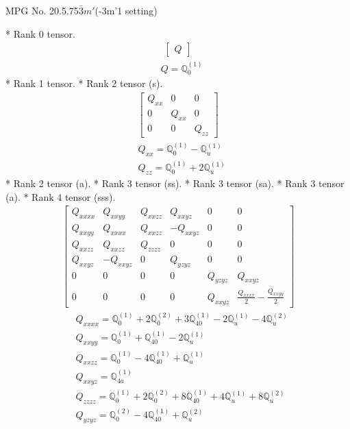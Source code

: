 \documentclass[fleqn,8pt,landscape]{jsarticle}
\begin{document}
\setcounter{MaxMatrixCols}{32}

\renewcommand{\tablename}{Table~}
\renewcommand{\figurename}{Figure~}
\begin{center}
\LARGE
MPG No. 20.5.75\quad$\bar{3}m'$\quad(-3m'1 setting)
\end{center}
* Rank 0 tensor.
\begin{align*}
\begin{bmatrix} Q \end{bmatrix}
\end{align*}
\begin{align*}
& Q = \mathbb{Q}_{0}^{(1)}
\end{align*}
* Rank 1 tensor.
* Rank 2 tensor (s).
\begin{align*}
\begin{bmatrix} Q_{xx} & 0 & 0 \\ 0 & Q_{xx} & 0 \\ 0 & 0 & Q_{zz} \end{bmatrix}
\end{align*}
\begin{align*}
& Q_{xx} = \mathbb{Q}_{0}^{(1)} - \mathbb{Q}_{u}^{(1)} \\
& Q_{zz} = \mathbb{Q}_{0}^{(1)} + 2 \mathbb{Q}_{u}^{(1)}
\end{align*}
* Rank 2 tensor (a).
* Rank 3 tensor (ss).
* Rank 3 tensor (sa).
* Rank 3 tensor (a).
* Rank 4 tensor (sss).
\begin{align*}
\begin{bmatrix} Q_{xxxx} & Q_{xxyy} & Q_{xxzz} & Q_{xxyz} & 0 & 0 \\ Q_{xxyy} & Q_{xxxx} & Q_{xxzz} & - Q_{xxyz} & 0 & 0 \\ Q_{xxzz} & Q_{xxzz} & Q_{zzzz} & 0 & 0 & 0 \\ Q_{xxyz} & - Q_{xxyz} & 0 & Q_{yzyz} & 0 & 0 \\ 0 & 0 & 0 & 0 & Q_{yzyz} & Q_{xxyz} \\ 0 & 0 & 0 & 0 & Q_{xxyz} & \frac{Q_{xxxx}}{2} - \frac{Q_{xxyy}}{2} \end{bmatrix}
\end{align*}
\begin{align*}
& Q_{xxxx} = \mathbb{Q}_{0}^{(1)} + 2 \mathbb{Q}_{0}^{(2)} + 3 \mathbb{Q}_{40}^{(1)} - 2 \mathbb{Q}_{u}^{(1)} - 4 \mathbb{Q}_{u}^{(2)} \\
& Q_{xxyy} = \mathbb{Q}_{0}^{(1)} + \mathbb{Q}_{40}^{(1)} - 2 \mathbb{Q}_{u}^{(1)} \\
& Q_{xxzz} = \mathbb{Q}_{0}^{(1)} - 4 \mathbb{Q}_{40}^{(1)} + \mathbb{Q}_{u}^{(1)} \\
& Q_{xxyz} = \mathbb{Q}_{4a}^{(1)} \\
& Q_{zzzz} = \mathbb{Q}_{0}^{(1)} + 2 \mathbb{Q}_{0}^{(2)} + 8 \mathbb{Q}_{40}^{(1)} + 4 \mathbb{Q}_{u}^{(1)} + 8 \mathbb{Q}_{u}^{(2)} \\
& Q_{yzyz} = \mathbb{Q}_{0}^{(2)} - 4 \mathbb{Q}_{40}^{(1)} + \mathbb{Q}_{u}^{(2)}
\end{align*}
\end{document}
